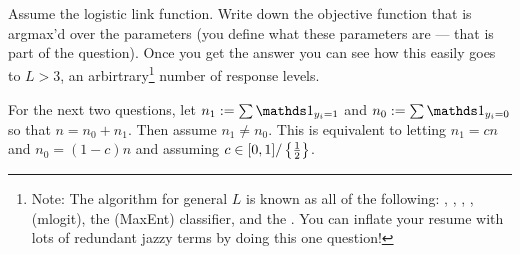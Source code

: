 \documentclass[12pt]{article}
\begin{document}
\begin{enumerate}
{Assume the logistic link function. Write down the objective function that is argmax'd over the parameters (you define what these parameters are --- that is part of the question). Once you get the answer you can see how this easily goes to $L > 3$, an arbirtrary\footnote{Note: The algorithm for general $L$ is known as all of the following: , , , ,  (mlogit), the  (MaxEnt) classifier, and the . You can inflate your resume with lots of redundant jazzy terms by doing this one question!} number of response levels.}\pagebreak

For the next two questions, let $n_1 := \sum \indic{y_i = 1}$ and $n_0 := \sum \indic{y_i = 0}$ so that $n = n_0 + n_1$. Then assume $n_1 \neq n_0$. This is equivalent to letting $n_1 = cn$ and $n_0 = (1-c)n$ and assuming $c \in [0,1]/\left\{\frac{1}{2}\right\}$.




\end{enumerate}


\end{document}
